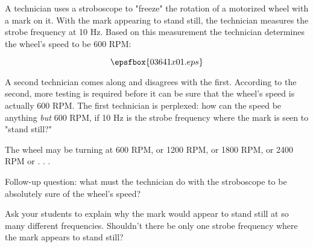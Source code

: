 

A technician uses a stroboscope to "freeze" the rotation of a motorized wheel with a mark on it.  With the mark appearing to stand still, the technician measures the strobe frequency at 10 Hz.  Based on this measurement the technician determines the wheel's speed to be 600 RPM:

$$\epsfbox{03641x01.eps}$$

A second technician comes along and disagrees with the first.  According to the second, more testing is required before it can be sure that the wheel's speed is actually 600 RPM.  The first technician is perplexed: how can the speed be anything {\it but} 600 RPM, if 10 Hz is the strobe frequency where the mark is seen to "stand still?"







The wheel may be turning at 600 RPM, or 1200 RPM, or 1800 RPM, or 2400 RPM or . . .

\vskip 10pt

Follow-up question: what must the technician do with the stroboscope to be absolutely sure of the wheel's speed?







Ask your students to explain why the mark would appear to stand still at so many different frequencies.  Shouldn't there be only one strobe frequency where the mark appears to stand still?




